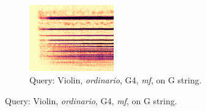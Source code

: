 \begin{figure}

        \begin{subfigure}{\linewidth}
                \centering
                \includegraphics[width=0.4\textwidth]{./figs/demo/Vn-ord-G4-mf-4c.png}
                \caption*{Query: Violin, \emph{ordinario}, G4, \emph{mf}, on G string.}
                \label{fig:Vn-ord-G4-mf-4c}
        \end{subfigure}%


\end{figure}

